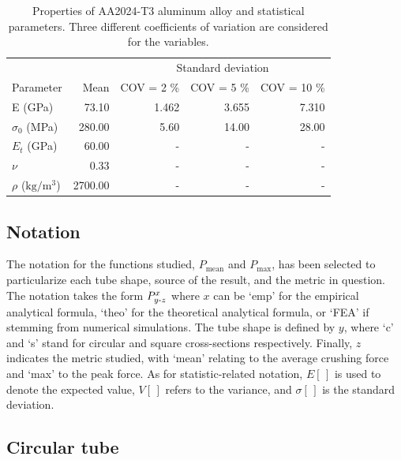 \documentclass[12pt,number,preprint,review,times]{elsarticle}
\begin{document}
\begin{table}[!htpb]
\begin{center}
\small
\begin{tabular}[t]{lrrrr} \toprule
 &  &  \multicolumn{3}{c}{Standard deviation}  \\\cmidrule{3-5}
Parameter & Mean       &    COV = 2 \%  &  COV = 5 \%      &    COV = 10 \%  \\\midrule
E (GPa)  &  73.10 &  1.462 & 3.655 & 7.310   \\
$\sigma_0$ (MPa) &  280.00 & 5.60 & 14.00 & 28.00 \\ %
$E_t$ (GPa)  &  60.00 &  - & - & -   \\
$\nu$  &  0.33 & - & - & - \\
$\rho$ ($\mathrm{kg/m^3}$) & 2700.00  & - & - & - \\
\bottomrule
\end{tabular}
\captionsetup{justification=centering}
\caption{Properties of AA2024-T3 aluminum alloy \citep{kay2003failure} and statistical parameters. Three different coefficients of variation are considered for the variables.}
\label{tab:alum}
\end{center}
\end{table}

\subsection{Notation}

The notation for the functions studied, $P^{\mathrm{}}_{\mathrm{mean}}$ and $P^{\mathrm{}}_{\mathrm{max}}$, has been selected to particularize each tube shape, source of the result, and the metric in question. The notation takes the form $P^{x}_{{y{\text -}z}}$ where $x$ can be `emp' for the empirical analytical formula, `theo' for the theoretical analytical formula, or `FEA' if stemming from numerical simulations. The tube shape is defined by $y$, where `c' and `s' stand for circular and square cross-sections respectively. Finally, $z$ indicates the metric studied, with `mean' relating to the average crushing force and `max' to the peak force. As for statistic-related notation, $E[\,]$ is used to denote the expected value, $V[\,]$ refers to the variance, and $\sigma[\,]$ is the standard deviation.

\subsection{Circular tube}
\end{document}
